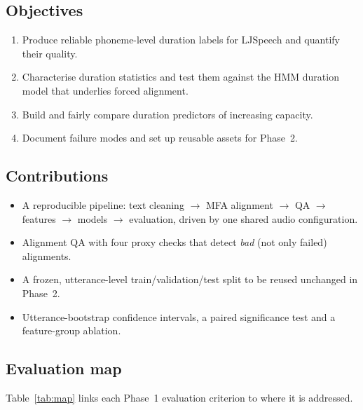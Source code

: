 \documentclass[conference]{IEEEtran}
\begin{document}
\subsection{Objectives}
\begin{enumerate}
\item Produce reliable phoneme-level duration labels for LJSpeech and quantify their quality.
\item Characterise duration statistics and test them against the HMM duration model that underlies forced alignment.
\item Build and fairly compare duration predictors of increasing capacity.
\item Document failure modes and set up reusable assets for Phase~2.
\end{enumerate}

\subsection{Contributions}
\begin{itemize}
\item A reproducible pipeline: text cleaning $\rightarrow$ MFA alignment $\rightarrow$ QA $\rightarrow$ features $\rightarrow$ models $\rightarrow$ evaluation, driven by one shared audio configuration.
\item Alignment QA with four proxy checks that detect \emph{bad} (not only failed) alignments.
\item A frozen, utterance-level train/validation/test split to be reused unchanged in Phase~2.
\item Utterance-bootstrap confidence intervals, a paired significance test and a feature-group ablation.
\end{itemize}

\subsection{Evaluation map}
Table~\ref{tab:map} links each Phase~1 evaluation criterion to where it is addressed.
\end{document}
